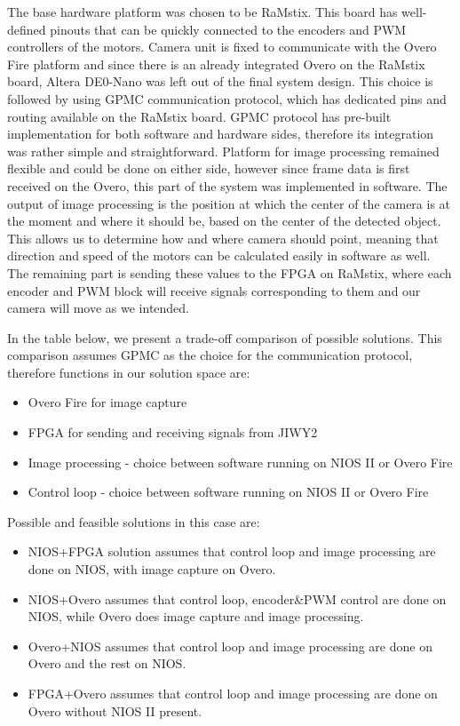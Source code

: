 The base hardware platform was chosen to be RaMstix. This board has well-defined pinouts that can be quickly connected to the encoders and PWM controllers of the motors. Camera unit is fixed to communicate with the Overo Fire platform and since there is an already integrated Overo on the RaMstix board, Altera DE0-Nano was left out of the final system design. This choice is followed by using GPMC communication protocol, which has dedicated pins and routing available on the RaMstix board. GPMC protocol has pre-built implementation for both software and hardware sides, therefore its integration was rather simple and straightforward. Platform for image processing remained flexible and could be done on either side, however since frame data is first received on the Overo, this part of the system was implemented in software. The output of image processing is the position at which the center of the camera is at the moment and where it should be, based on the center of the detected object. This allows us to determine how and where camera should point, meaning that direction and speed of the motors can be calculated easily in software as well. The remaining part is sending these values to the FPGA on RaMstix, where each encoder and PWM block will receive signals corresponding to them and our camera will move as we intended.

In the table below, we present a trade-off comparison of possible solutions. This comparison assumes GPMC as the choice for the communication protocol, therefore functions in our solution space are:
\begin{itemize}
 \item Overo Fire for image capture
 \item FPGA for sending and receiving signals from JIWY2
 \item Image processing - choice between software running on NIOS II or Overo Fire
 \item Control loop - choice between software running on NIOS II or Overo Fire
\end{itemize}

Possible and feasible solutions in this case are:
\begin{itemize}
 \item NIOS+FPGA solution assumes that control loop and image processing are done on NIOS, with image capture on Overo.
 \item NIOS+Overo assumes that control loop, encoder&PWM control are done on NIOS, while Overo does image capture and image processing.
 \item Overo+NIOS assumes that control loop and image processing are done on Overo and the rest on NIOS.
 \item FPGA+Overo assumes that control loop and image processing are done on Overo without NIOS II present.
\end{itemize}

